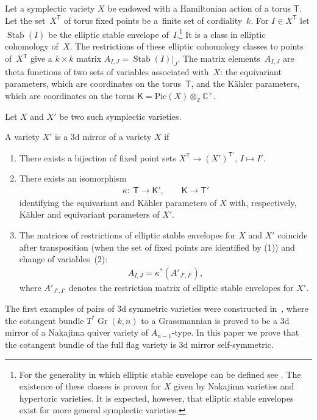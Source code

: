 \documentclass[pdftex]{sigma}
\DeclareMathOperator\Stab{Stab}
\DeclareMathOperator\Gr{Gr}
\newcommand{\bK}{\mathsf{K}}
\def\Z{{\mathbb Z}}
\def\C{{\mathbb C}}
\newcommand{\bT}{\mathsf{T}}
\numberwithin{equation}{section}
\begin{document}
Let a symplectic variety $X$ be endowed with a Hamiltonian action of a torus $\bT$. Let the set~$X^{\bT}$ of torus fixed points be a~finite set of cordiality~$k$. For $I\in X^{\bT}$ let $\Stab(I)$ be the elliptic stable envelope of~$I$.\footnote{For the generality in which elliptic stable envelope can be defined see \cite[Chapter~3]{MO}. The existence of these classes is proven for $X$ given by Nakajima varieties and hypertoric varieties. It is expected, however, that elliptic stable envelopes exist for more general symplectic varieties.} It is a class in elliptic cohomology of~$X$. The restrictions of these elliptic cohomology classes to points of~$X^{\bT}$ give a $k\times k$ matrix $A_{I,J}= \Stab(I) |_{J}$. The matrix elements~$A_{I,J}$ are theta functions of two sets of variables associated with~$X$: the equivariant parameters, which are coordinates on the torus~$\bT$, and the K\"ahler parameters, which are coordinates on the torus $\bK=\mathrm{Pic}(X)\otimes_{\Z} \C^{\times}$.

Let $X$ and $X'$ be two such symplectic varieties.

\begin{Definition} \label{maindefin}
 A variety $X'$ is a 3d mirror of a variety $X$ if
 \begin{enumerate}\itemsep=0pt
 \item[(1)] There exists a bijection of fixed point sets $X^{\bT}\rightarrow (X')^{\bT'}$, $I\mapsto I'$.
 \item[(2)] There exists an isomorphism
 \begin{gather*}
 \kappa\colon \ \bT \rightarrow \bK', \qquad \bK \rightarrow \bT'
 \end{gather*}
 identifying the equivariant and K\"ahler parameters of $X$ with, respectively, K\"ahler and equivariant parameters of $X'$.
 \item[(3)] The matrices of restrictions of elliptic stable envelopes for $X$ and $X'$ coincide after transposition (when the set of fixed points are identified by (1)) and change of variables~(2):
 \begin{gather} \label{acoin}
 A_{I,J}=\kappa^{*}( A'_{J',I'}),
 \end{gather}
 where $A'_{J',I'}$ denotes the restriction matrix of elliptic stable envelopes for $X'$.
 \end{enumerate}
\end{Definition}

The first examples of pairs of 3d symmetric varieties were constructed in~\cite{RVSZ}, where the cotangent bundle $T^*\Gr(k,n)$ to a Grassmannian is proved to be
a 3d mirror of a Nakajima quiver variety of $A_{n-1}$-type. In this paper we prove that the cotangent bundle of the full flag variety is 3d mirror self-symmetric.
\end{document}
